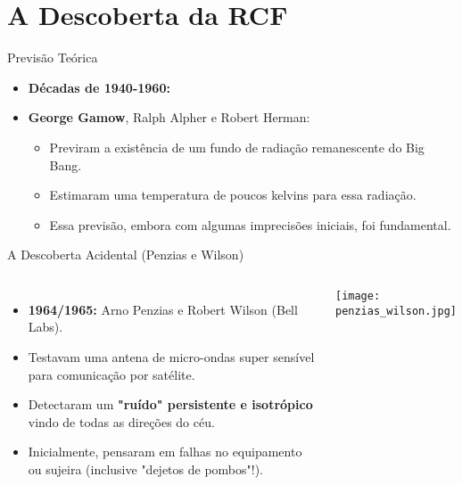 \documentclass{beamer}
\begin{document}
\section{A Descoberta da RCF}

\begin{frame}{Previsão Teórica}
    \begin{itemize}
        \item \textbf{Décadas de 1940-1960:}
        \item \textbf{George Gamow}, Ralph Alpher e Robert Herman:
        \begin{itemize}
            \item Previram a existência de um fundo de radiação remanescente do Big Bang.
            \item Estimaram uma temperatura de poucos kelvins para essa radiação.
            \item Essa previsão, embora com algumas imprecisões iniciais, foi fundamental.
        \end{itemize}
    \end{itemize}
\end{frame}

\begin{frame}{A Descoberta Acidental (Penzias e Wilson)}
    \begin{columns}
        \begin{itemize}
            \item \textbf{1964/1965:} Arno Penzias e Robert Wilson (Bell Labs).
            \item Testavam uma antena de micro-ondas super sensível para comunicação por satélite.
            \item Detectaram um \textbf{"ruído" persistente e isotrópico} vindo de todas as direções do céu.
            \item Inicialmente, pensaram em falhas no equipamento ou sujeira (inclusive "dejetos de pombos"!).
        \end{itemize}
        \begin{center}
            \texttt{[image: penzias\_wilson.jpg]} %

            \tiny
        \end{center}
    \end{columns}
\end{frame}
\end{document}
